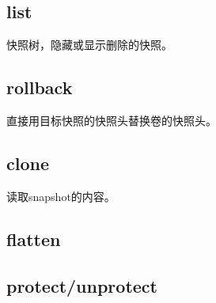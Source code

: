\subsection{list}

快照树，隐藏或显示删除的快照。

\subsection{rollback}

直接用目标快照的快照头替换卷的快照头。

\subsection{clone}

读取snapshot的内容。

\subsection{flatten}

\subsection{protect/unprotect}
